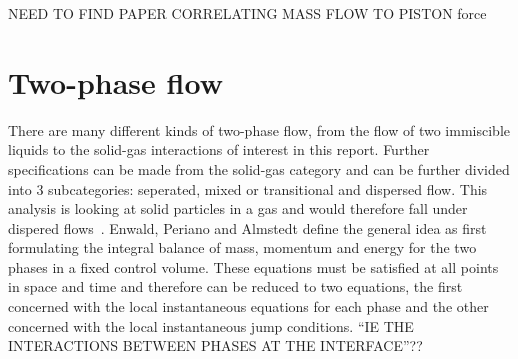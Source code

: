 
NEED TO FIND PAPER CORRELATING MASS FLOW TO PISTON force
\newpage
\section{Two-phase flow}
There are many different kinds of two-phase flow, from the flow of two immiscible liquids to the solid-gas interactions of interest in this report. Further specifications can be made from the solid-gas category and can be further divided into 3 subcategories: seperated, mixed or transitional and dispersed flow. This analysis is looking at solid particles in a gas and would therefore fall under dispered flows~\cite{enwald1996eulerian}. Enwald, Periano and Almstedt define the general idea as first formulating the integral balance of mass, momentum and energy for the two phases in a fixed control volume. These equations must be satisfied at all points in space and time and therefore can be reduced to two equations, the first concerned with the local instantaneous equations for each phase and the other concerned with the local instantaneous jump conditions. ``IE THE INTERACTIONS BETWEEN PHASES AT THE INTERFACE''??

